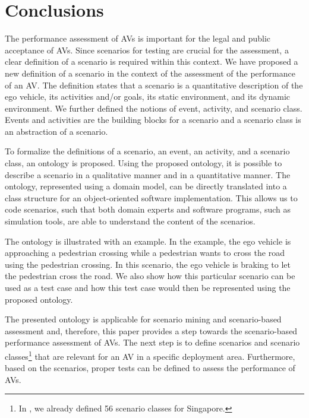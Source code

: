 \cbstart
\section{Conclusions}
\label{sec:conclusion}

The performance assessment of AVs is important for the legal and public acceptance of AVs. 
Since scenarios for testing are crucial for the assessment, a clear definition of a scenario is required within this context. 
We have proposed a new definition of a scenario in the context of the assessment of the performance of an AV. 
The definition states that a scenario is a quantitative description of the ego vehicle, its activities and/or goals, its static environment, and its dynamic environment. 
We further defined the notions of event, activity, and scenario class. Events and activities are the building blocks for a scenario and a scenario class is an abstraction of a scenario.

To formalize the definitions of a scenario, an event, an activity, and a scenario class, an ontology is proposed. Using the proposed ontology, it is possible to describe a scenario in a qualitative manner and in a quantitative manner. The ontology, represented using a domain model, can be directly translated into a class structure for an object-oriented software implementation. This allows us to code scenarios, such that both domain experts and software programs, such as simulation tools, are able to understand the content of the scenarios. 

The ontology is illustrated with an example. In the example, the ego vehicle is approaching a pedestrian crossing while a pedestrian wants to cross the road using the pedestrian crossing. In this scenario, the ego vehicle is braking to let the pedestrian cross the road. We also show how this particular scenario can be used as a test case and how this test case would then be represented using the proposed ontology.

The presented ontology is applicable for scenario mining and scenario-based assessment and, therefore, this paper provides a step towards the scenario-based performance assessment of AVs. The next step is to define scenarios and scenario classes\footnote{\cbstart In \cite{degelder2019scenarioclasses}, we already defined 56 scenario classes for Singapore.\cbend} that are relevant for an AV in a specific deployment area. Furthermore, based on the scenarios, proper tests can be defined to assess the performance of AVs. 
\cbend
